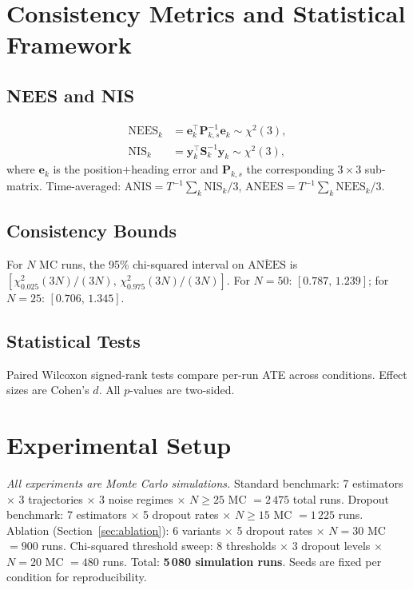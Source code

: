 \documentclass[letterpaper, 10pt, journal]{IEEEtran}
\newcommand{\bmP}{\bm{P}}
\newcommand{\bmS}{\bm{S}}
\newcommand{\bmy}{\bm{y}}
\begin{document}
\section{Consistency Metrics and Statistical Framework}
\label{sec:metrics}

\subsection{NEES and NIS}
\begin{align}
  \text{NEES}_k &= \bm{e}_k^\top \bmP_{k,s}^{-1} \bm{e}_k \sim \chi^2(3),
  \label{eq:nees}\\
  \text{NIS}_k  &= \bmy_k^\top \bmS_k^{-1} \bmy_k \sim \chi^2(3),
  \label{eq:nis}
\end{align}
where $\bm{e}_k$ is the position+heading error and $\bmP_{k,s}$ the
corresponding $3{\times}3$ sub-matrix.
Time-averaged: $\overline{\text{ANIS}} = T^{-1}\sum_k \text{NIS}_k/3$,
$\overline{\text{ANEES}} = T^{-1}\sum_k \text{NEES}_k/3$.

\subsection{Consistency Bounds}
For $N$ MC runs, the 95\% chi-squared interval on $\overline{\text{ANEES}}$
is $[\chi^2_{0.025}(3N)/(3N),\,\chi^2_{0.975}(3N)/(3N)]$.
For $N=50$: $[0.787,\,1.239]$; for $N=25$: $[0.706,\,1.345]$.

\subsection{Statistical Tests}
Paired Wilcoxon signed-rank tests compare per-run ATE across conditions.
Effect sizes are Cohen's $d$. All $p$-values are two-sided.

\section{Experimental Setup}
\label{sec:setup}

\emph{All experiments are Monte Carlo simulations.}
Standard benchmark: 7 estimators $\times$ 3 trajectories $\times$ 3 noise
regimes $\times$ $N\!\geq\!25$ MC $= 2\,475$ total runs.
Dropout benchmark: 7 estimators $\times$ 5 dropout rates $\times$
$N\!\geq\!15$ MC $= 1\,225$ runs.
Ablation (Section~\ref{sec:ablation}): 6 variants $\times$ 5 dropout rates
$\times$ $N{=}30$ MC $= 900$ runs.
Chi-squared threshold sweep: 8 thresholds $\times$ 3 dropout levels $\times$
$N{=}20$ MC $= 480$ runs.
Total: \textbf{5\,080 simulation runs}.
Seeds are fixed per condition for reproducibility.
\end{document}
